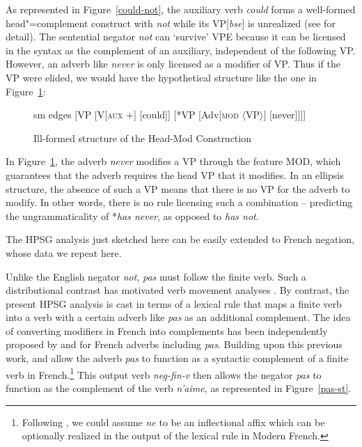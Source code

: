 \documentclass[output=paper
                ,modfonts
                		,nonflat
	        ,collection
	        ,collectionchapter
	        ,collectiontoclongg
 	        ,biblatex
                ,babelshorthands
                ,newtxmath
                ,draftmode
                ,colorlinks, citecolor=brown
]{./langsci/langscibook}
\begin{document}
{\begin{exe}
\begin{xlist}
\begin{exe}
\begin{xlist}
As represented in Figure~\ref{could-not}, the auxiliary verb \textit{could} forms a well-formed head"=complement construct with \textit{not} while its
VP[\textit{bse}] is unrealized (see \citet{Kim:00, KS:08} for
detail). The sentential negator \textit{not} can `survive' VPE because it can be
licensed in the syntax as the complement of an auxiliary, independent
of the following VP.  However, an adverb like \textit{never} is only
licensed as a modifier of VP. Thus if the VP were elided, we would have the hypothetical
structure like the one in Figure~\ref{fig-could-never}:
\begin{figure}
	\begin{forest}
		sm edges
		[VP
			[V{[\textsc{aux $+$}]}
				[could]]
			[*VP
				[Adv{[\textsc{mod} $\langle$VP$\rangle$]}
					[never]]]]
	\end{forest}
\caption{Ill-formed structure of the Head-Mod Construction}\label{fig-could-never}
\end{figure}
In Figure~\ref{fig-could-never}, the adverb \textit{never} modifies a VP through the feature MOD,
which guarantees that the adverb requires the head VP that it
modifies. In an ellipsis structure, the absence of such a VP means
that there is no VP for the adverb to modify.  In other words, there
is no rule licensing such a combination -- predicting the
ungrammaticality of *\textit{has never},  as opposed to \textit{has not}.


The HPSG analysis just sketched here can be easily extended to French negation, whose
data we repeat here.

\eal
{}
\zl

\noindent
Unlike the English negator \textit{not}, \textit{pas} must follow the
finite verb. Such a distributional contrast has motivated verb
movement analyses \citep[see]{Pollock:89,Zanuttini:01}.
By contrast, the present HPSG analysis is cast
in terms of a lexical rule that maps a finite verb into a verb
with a certain adverb like \textit{pas} as an additional complement.
 The idea of converting modifiers in French into
complements has been independently proposed by \citet{Miller92d-u} and
\citet{AG:94} for French adverbs including
\textit{pas}.  Building upon this
previous work, \citet{AG:97} and \citet{Kim:00}
allow the adverb \textit{pas} to function
as a syntactic complement of a finite verb in French.\footnote{Following \citet{AG:94}, we could assume \textit{ne} to
be an inflectional affix which can be optionally realized
in the output of the lexical rule in Modern French.}
This output verb \textit{neg-fin-v} then allows the negator \textit{pas} to function
as the complement of the verb \textit{n'aime}, as represented in Figure~\ref{pas-st}.


\end{xlist}
\end{exe}
\end{xlist}
\end{exe}}
\end{document}
